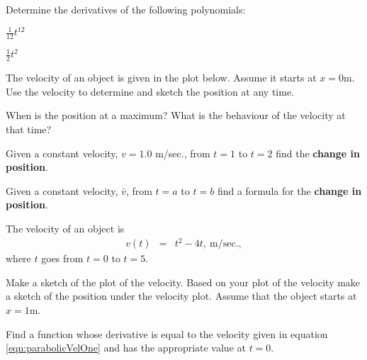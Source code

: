 \begin{problem}
\item Determine the derivatives of the following polynomials:
  \begin{subproblem}
    \item $\frac{1}{12} t^{12}$
      \vfill
    \item $\frac{1}{2} t^{2}$
      \vfill
  \end{subproblem}

\item The velocity of an object is given in the plot below. Assume it
  starts at $x=0$m. Use the velocity to determine and sketch the
  position at any time.

  \scalebox{0.7}{}


  \begin{subproblem}
  \item When is the position at a maximum? What is the behaviour of
    the velocity at that time?
    \vspace{3em}
  \item Given a constant velocity, $v=1.0$ m/sec., from $t=1$ to $t=2$
    find the \textbf{change in position}.
    \vfill
  \item Given a constant velocity, $\bar{v}$, from $t=a$ to $t=b$ find
    a formula for the \textbf{change in position}.
    \vfill
  \end{subproblem}

\item The velocity of an object is
  \begin{eqnarray}
    \label{eqn:parabolicVelOne}
    v(t) & = & t^2 - 4t, ~ \mathrm{m/sec.},
  \end{eqnarray}
  where $t$ goes from $t=0$ to $t=5$.

  \begin{subproblem}
  \item Make a sketch of the plot of the velocity.  Based on your plot
    of the velocity make a sketch of the position under the velocity
    plot. Assume that the object starts at $x=1$m.

    \vfill

  \item Find a function whose derivative is equal to the velocity
    given in equation \ref{eqn:parabolicVelOne} and has the appropriate
    value at $t=0$.


\end{subproblem}
\end{problem}
